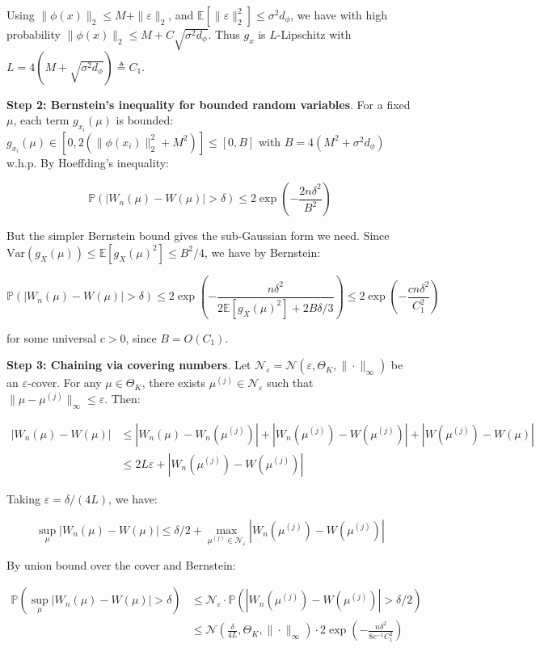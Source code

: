 \documentclass[
  12pt,
]{article}
\begin{document}
Using \(\|\phi(x)\|_2 \leq M + \|\varepsilon\|_2\), and
\(\mathbb{E}[\|\varepsilon\|_2^2] \leq \sigma^2 d_\phi\), we have with
high probability \(\|\phi(x)\|_2 \leq M + C\sqrt{\sigma^2 d_\phi}\).
Thus \(g_x\) is \(L\)-Lipschitz with
\(L = 4(M + \sqrt{\sigma^2 d_\phi}) \triangleq C_1\).

\textbf{Step 2: Bernstein's inequality for bounded random variables}.
For a fixed \(\mu\), each term \(g_{x_i}(\mu)\) is bounded:
\(g_{x_i}(\mu) \in [0, 2(\|\phi(x_i)\|_2^2 + M^2)] \leq [0, B]\) with
\(B = 4(M^2 + \sigma^2 d_\phi)\) w.h.p. By Hoeffding's inequality:

\[\mathbb{P}(|W_n(\mu) - W(\mu)| > \delta) \leq 2\exp\left(-\frac{2n\delta^2}{B^2}\right)\]

But the simpler Bernstein bound gives the sub-Gaussian form we need.
Since \(\text{Var}(g_X(\mu)) \leq \mathbb{E}[g_X(\mu)^2] \leq B^2/4\),
we have by Bernstein:

\[\mathbb{P}(|W_n(\mu) - W(\mu)| > \delta) \leq 2\exp\left(-\frac{n\delta^2}{2\mathbb{E}[g_X(\mu)^2] + 2B\delta/3}\right) \leq 2\exp\left(-\frac{c n \delta^2}{C_1^2}\right)\]

for some universal \(c > 0\), since \(B = O(C_1)\).

\textbf{Step 3: Chaining via covering numbers}. Let
\(\mathcal{N}_\varepsilon = \mathcal{N}(\varepsilon, \Theta_K, \|\cdot\|_\infty)\)
be an \(\varepsilon\)-cover. For any \(\mu \in \Theta_K\), there exists
\(\mu^{(j)} \in \mathcal{N}_\varepsilon\) such that
\(\|\mu - \mu^{(j)}\|_\infty \leq \varepsilon\). Then:

\[\begin{aligned}
|W_n(\mu) - W(\mu)|
&\leq |W_n(\mu) - W_n(\mu^{(j)})| + |W_n(\mu^{(j)}) - W(\mu^{(j)})| + |W(\mu^{(j)}) - W(\mu)| \\
&\leq 2L\varepsilon + |W_n(\mu^{(j)}) - W(\mu^{(j)})|
\end{aligned}\]

Taking \(\varepsilon = \delta/(4L)\), we have:

\[\sup_{\mu} |W_n(\mu) - W(\mu)| \leq \delta/2 + \max_{\mu^{(j)} \in \mathcal{N}_\varepsilon} |W_n(\mu^{(j)}) - W(\mu^{(j)})|\]

By union bound over the cover and Bernstein:

\[\begin{aligned}
\mathbb{P}\left(\sup_{\mu} |W_n(\mu) - W(\mu)| > \delta\right)
&\leq \mathcal{N}_\varepsilon \cdot \mathbb{P}\left(|W_n(\mu^{(j)}) - W(\mu^{(j)})| > \delta/2\right) \\
&\leq \mathcal{N}\left(\frac{\delta}{4L}, \Theta_K, \|\cdot\|_\infty\right) \cdot 2\exp\left(-\frac{n \delta^2}{8c^{-1} C_1^2}\right)
\end{aligned}\]
\end{document}
